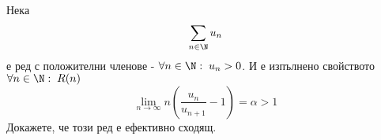 \begin{problem}
    Нека 
    \begin{equation}
        \sum\limits_{n\in\N} u_n
    \end{equation}
    е ред с положителни членове - $\forall n\in\N:\; u_n > 0$. И е изпълнено свойството $\forall n\in\N:\; R(n)$
    \begin{equation}\label{eq:raabe-property}
        \lim\limits_{n\to\infty} n\left( \frac{u_n}{u_{n+1}} - 1 \right) = \alpha > 1
    \end{equation}
    Докажете, че този ред е ефективно сходящ.
\end{problem}